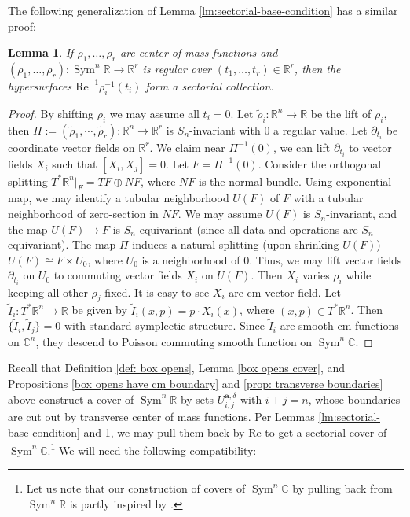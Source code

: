 \documentclass{article}
\def\R{\mathbb{R}}
\def\C{\mathbb{C}}
\def\d{\partial}
\def\wt{\widetilde}
\DeclareMathOperator{\Sym}{Sym}
\renewcommand{\Re}{\mathrm{Re}}
\def\ba{\mathbf{a}} %
\newtheorem{lemma}[theorem]{Lemma}
\theoremstyle{definition}
\begin{document}
The following generalization of Lemma \ref{lm:sectorial-base-condition} has a similar proof: 

\begin{lemma} \label{lem: sectorial collection criterion}
If $\rho_1, \ldots, \rho_r$ are center of mass functions and $(\rho_1, \ldots, \rho_r): \Sym^n \R \to \R^r$ is regular over $(t_1, \ldots, t_r) \in \R^r$, then the hypersurfaces $\Re^{-1} \rho_i^{-1}(t_i)$ form a sectorial collection.  
\end{lemma}
\begin{proof}
 By shifting $\rho_i$ we may assume all $t_i=0$. Let $\wt \rho_i: \R^n \to \R$ be the lift of $\rho_i$, then $\Pi:=(\wt \rho_1, \cdots, \wt \rho_r): \R^n \to \R^r$ is $S_n$-invariant  with $0$ a regular value. Let $\d_{t_i}$ be coordinate vector fields on $\R^r$. We claim near $\Pi^{-1}(0)$, we can lift $\d_{t_i}$ to vector fields $X_i$ such that $[X_i, X_j]=0$. Let $F = \Pi^{-1}(0)$. Consider the orthogonal splitting $T^*\R^n|_F = TF \oplus NF $, where $NF$ is the normal bundle. Using exponential map, we may identify a tubular neighborhood $U(F)$ of $F$ with a tubular neighborhood of zero-section in $NF$. We may assume $U(F)$ is $S_n$-invariant, and the map $U(F) \to F$ is $S_n$-equivariant (since all data and operations are $S_n$-equivariant). The map $\Pi$ induces a natural splitting (upon shrinking $U(F)$) $U(F) \cong F \times U_0$, where $U_0$ is a neighborhood of $0$. Thus, we may lift vector fields $\d_{t_i}$ on $U_0$ to commuting vector fields $X_i$ on $U(F)$. Then $X_i$ varies $\rho_i$ while keeping all other $\rho_j$ fixed. It is easy to see $X_i$ are cm vector field. Let $\wt I_i: T^*\R^n \to \R$ be given by $\wt I_i(x,p) = p \cdot X_i(x)$, where $(x,p) \in T^*\R^n$. Then $\{\wt I_i, \wt I_j\}=0$ with standard symplectic structure. Since $\wt I_i$ are smooth cm functions on $\C^n$, they descend to Poisson commuting smooth function on $\Sym^n \C$. 
\end{proof}





Recall that Definition \ref{def: box opens}, Lemma \ref{box opens cover}, and Propositions \ref{box opens have cm boundary} and \ref{prop: transverse boundaries} above construct a cover of $\Sym^n \R$ by sets $U^{\ba,\delta}_{i,j}$ with $i+j=n$, whose boundaries are cut out by transverse center of mass functions.  Per Lemmas \ref{lm:sectorial-base-condition} and \ref{lem: sectorial collection criterion}, we may pull them back by $\Re$ to get a sectorial cover of $\Sym^n \C$.\footnote{Let us note that our construction of covers of $\Sym^n\C$ by pulling back from $\Sym^n \R$ is partly inspired by  \cite{Kapranov-Schectman-shuffle}.} We will need the following compatibility: 
\end{document}
